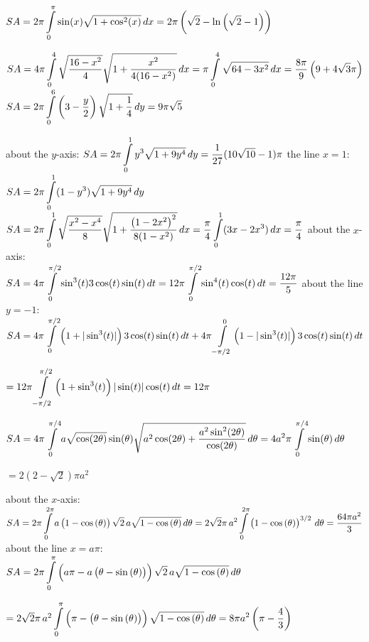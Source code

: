 \begin{Answer}
    
    \Question $SA =2 \pi \displaystyle \int \limits_{0}^{\pi} \sin(x) \sqrt{1+\cos^2(x)} \, dx = 2 \pi \left( \sqrt{2} - \ln  \left(\sqrt{2} - 1\right)\right) $
     
    \Question $SA =  4 \pi \displaystyle \int\limits_{0}^{4}  \sqrt{\dfrac{16-x^2}{4}}  \sqrt{1+ \dfrac{x^2}{4(16-x^2)}} \, dx = \pi \displaystyle \int\limits_{0}^{4} \sqrt{64 - 3x^2} \, dx = \dfrac{8 \pi}{9}\left(9+4\sqrt{3} \pi\right) $	
    \Question $SA=2 \pi \displaystyle \int \limits_{0}^{6} \left(3-\dfrac{y}{2}\right) \sqrt{1+\dfrac{1}{4}} \, dy 
    = 9 \pi \sqrt{5} $
      
    \Question \subQuestion about the $y$-axis: $SA = 2 \pi \displaystyle \int\limits_{0}^{1} y^3 \sqrt{1 + 9y^4} \, dy = \dfrac{1}{27}(10 \sqrt{10} - 1) \pi$ 
    \subQuestion the line $x=1$: $SA = 2 \pi \displaystyle \int\limits_{0}^{1} (1-y^3) \sqrt{1 + 9y^4} \, dy$  
    \Question $SA =  2 \pi \displaystyle \int\limits_{0}^{1}  \sqrt{\dfrac{x^2-x^4}{8}}  \sqrt{1+ \dfrac{\left(1-2x^2\right)^2}{8(1-x^2)}} \, dx   = \dfrac{\pi}{4} \displaystyle \int\limits_{0}^{1} (3x-2x^3) \, dx = \dfrac{\pi}{4} $
    \Question \subQuestion about the $x$-axis: \\[0.2cm]
    $SA = 4 \pi \displaystyle \int\limits_{0}^{\pi/2} \sin^3 (t)3 \cos(t) \sin(t) \, dt =12 \pi \displaystyle \int\limits_{0}^{\pi/2} \sin^4 (t) \cos(t) \, dt = \dfrac{12 \pi}{5}$ 
    \subQuestion  about the line $y=-1$: \\[0.2cm]
    $SA =4 \pi \displaystyle \int\limits_{0}^{\pi/2} \left(1+ |\sin^3 (t)| \right) 3\cos(t) \sin(t) \, dt +  4 \pi \displaystyle \int\limits_{-\pi/2}^{0} \left(1-|\sin^3 (t)| \right)  3\cos(t) \sin(t) \, dt$ \par 
    \hspace{0.6cm}$ = 12 \pi \displaystyle \int\limits_{-\pi/2}^{\pi/2} \left(1+ \sin^3 (t) \right) |\sin(t)| \cos(t) \, dt = 12 \pi$  
    
    \Question $SA = 4 \pi \displaystyle \int\limits_{0}^{\pi/4} a \sqrt{\cos(2\theta)} \sin(\theta)  \sqrt{a^2 \cos(2\theta) + \dfrac{a^2 \sin^2(2 \theta)}{\cos(2 \theta)}} \, d\theta
    =  4 a^2 \pi \displaystyle \int\limits_{0}^{\pi/4}  \sin(\theta)\, d\theta$ \par 
    \hspace{0.6cm}$ = 2(2-\sqrt{2})\pi a^2 $ 
    
    
    \Question \subQuestion about the $x$-axis: \\[0.2cm]
    $SA = 2\pi \displaystyle \int \limits_0^{2\pi}  a\left(1- \cos \left(\theta\right)\right) \sqrt{2}\, a\sqrt{1-\cos \left(\theta\right)}\,d\theta  =  2\sqrt{2} \pi \, a^2 \displaystyle \int \limits_0^{2\pi}  \left(1- \cos \left(\theta\right)\right)^{3/2} \,d\theta   = \dfrac{64\pi a^2}{3}$ 
    \subQuestion about the line $x=a\pi$: \\[0.2cm]
    $SA = 2\pi \displaystyle \int \limits_0^{\pi}   \left(a\pi- a\left(\theta - \sin \left(\theta\right)\right) \right) \sqrt{2}\, a\sqrt{1-\cos \left(\theta\right)}\,d\theta $ \par
    \hspace{0.4cm} $=
     2\sqrt{2} \pi \, a^2 \displaystyle \int \limits_0^{\pi}   \left(\pi- \left(\theta - \sin \left(\theta\right)\right) \right) \sqrt{1-\cos \left(\theta\right)}\,d\theta=
    8\pi a^2\left(\pi-\dfrac{4}{3}\right)$
    

\end{Answer}
